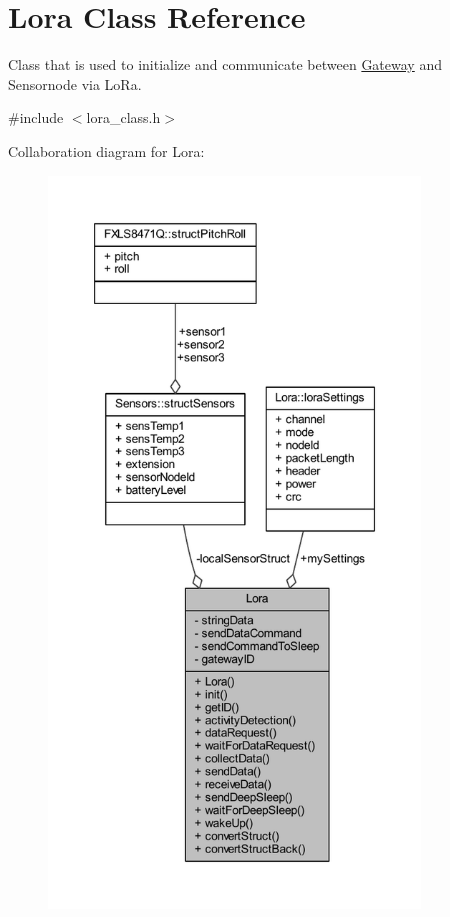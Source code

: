 \hypertarget{class_lora}{}\section{Lora Class Reference}
\label{class_lora}


Class that is used to initialize and communicate between \hyperlink{class_gateway}{Gateway} and Sensornode via Lo\+Ra.  




{\ttfamily \#include $<$lora\+\_\+class.\+h$>$}



Collaboration diagram for Lora\+:
\nopagebreak
\begin{figure}[H]
\begin{center}
\leavevmode
\includegraphics[height=550pt]{class_lora__coll__graph}
\end{center}
\end{figure}
